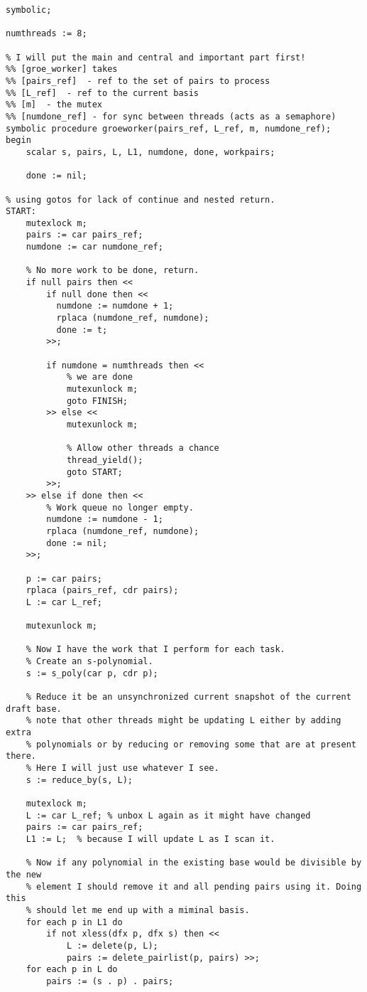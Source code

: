 \begin{code}
\begin{verbatim}
symbolic;

numthreads := 8;

% I will put the main and central and important part first!
%% [groe_worker] takes
%% [pairs_ref]  - ref to the set of pairs to process
%% [L_ref]  - ref to the current basis
%% [m]  - the mutex
%% [numdone_ref] - for sync between threads (acts as a semaphore)
symbolic procedure groeworker(pairs_ref, L_ref, m, numdone_ref);
begin
    scalar s, pairs, L, L1, numdone, done, workpairs;

    done := nil;

% using gotos for lack of continue and nested return.
START:
    mutexlock m;
    pairs := car pairs_ref;
    numdone := car numdone_ref;

    % No more work to be done, return.
    if null pairs then <<
        if null done then <<
          numdone := numdone + 1;
          rplaca (numdone_ref, numdone);
          done := t;
        >>;

        if numdone = numthreads then <<
            % we are done
            mutexunlock m;
            goto FINISH;
        >> else <<
            mutexunlock m;

            % Allow other threads a chance
            thread_yield();
            goto START;
        >>;
    >> else if done then <<
        % Work queue no longer empty.
        numdone := numdone - 1;
        rplaca (numdone_ref, numdone);
        done := nil;
    >>;

    p := car pairs;
    rplaca (pairs_ref, cdr pairs);
    L := car L_ref;

    mutexunlock m;

    % Now I have the work that I perform for each task.
    % Create an s-polynomial.
    s := s_poly(car p, cdr p);

    % Reduce it be an unsynchronized current snapshot of the current draft base.
    % note that other threads might be updating L either by adding extra
    % polynomials or by reducing or removing some that are at present there.
    % Here I will just use whatever I see.
    s := reduce_by(s, L);

    mutexlock m;
    L := car L_ref; % unbox L again as it might have changed
    pairs := car pairs_ref;
    L1 := L;  % because I will update L as I scan it.

    % Now if any polynomial in the existing base would be divisible by the new
    % element I should remove it and all pending pairs using it. Doing this
    % should let me end up with a miminal basis.
    for each p in L1 do
        if not xless(dfx p, dfx s) then <<
            L := delete(p, L);
            pairs := delete_pairlist(p, pairs) >>;
    for each p in L do
        pairs := (s . p) . pairs;


\end{verbatim}
\end{code}

